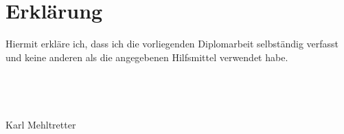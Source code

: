\chapter*{Erkl\"arung}
Hiermit erkl\"are ich, dass ich die vorliegenden Diplomarbeit selbst\"andig verfasst und keine anderen als die angegebenen Hilfsmittel verwendet habe.
\\
\\
\\
\\
\\
{\Large Karl Mehltretter}\\